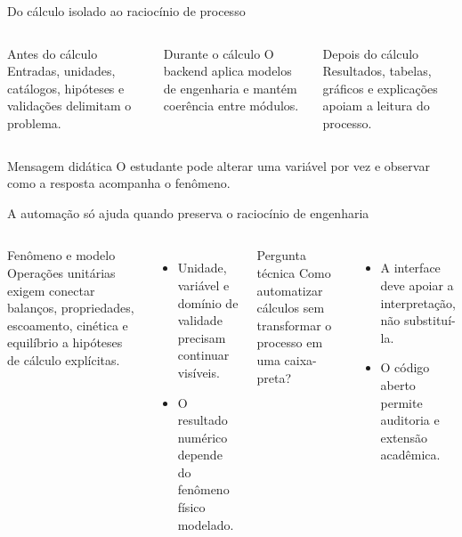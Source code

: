 \begin{frame}{Do cálculo isolado ao raciocínio de processo}
  \begin{columns}[T,onlytextwidth]
      \begin{block}{Antes do cálculo}
        Entradas, unidades, catálogos, hipóteses e validações delimitam o problema.
      \end{block}
      \begin{block}{Durante o cálculo}
        O backend aplica modelos de engenharia e mantém coerência entre módulos.
      \end{block}
      \begin{block}{Depois do cálculo}
        Resultados, tabelas, gráficos e explicações apoiam a leitura do processo.
      \end{block}
  \end{columns}
  \vspace{0.65em}
  \begin{alertblock}{Mensagem didática}
    O estudante pode alterar uma variável por vez e observar como a resposta acompanha o fenômeno.
  \end{alertblock}
\end{frame}

\begin{frame}{A automação só ajuda quando preserva o raciocínio de engenharia}
  \begin{columns}[T,onlytextwidth]
      \begin{block}{Fenômeno e modelo}
        Operações unitárias exigem conectar balanços, propriedades, escoamento, cinética e equilíbrio a hipóteses de cálculo explícitas.
      \end{block}
      \begin{itemize}
        \item Unidade, variável e domínio de validade precisam continuar visíveis.
        \item O resultado numérico depende do fenômeno físico modelado.
      \end{itemize}
      \begin{alertblock}{Pergunta técnica}
        Como automatizar cálculos sem transformar o processo em uma caixa-preta?
      \end{alertblock}
      \begin{itemize}
        \item A interface deve apoiar a interpretação, não substituí-la.
        \item O código aberto permite auditoria e extensão acadêmica.
      \end{itemize}
  \end{columns}
\end{frame}

